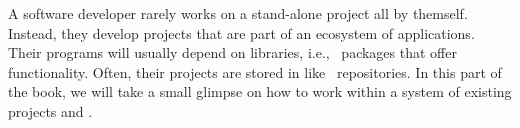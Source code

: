 %
%
A software developer rarely works on a stand-alone project all by themself.
Instead, they develop projects that are part of an ecosystem of applications.
Their programs will usually depend on libraries, i.e., \python\ packages that offer functionality.
Often, their projects are stored in  like \git\ repositories.
In this part of the book, we will take a small glimpse on how to work within a system of existing projects and .%
%
%
%
%
\endhsection%
